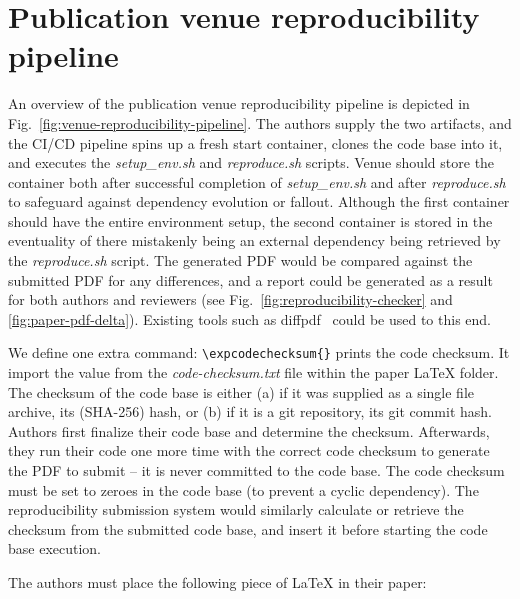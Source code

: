 
\section{Publication venue reproducibility pipeline}
\label{appendix:reproducibility}

An overview of the publication venue reproducibility pipeline is depicted in Fig.~\ref{fig:venue-reproducibility-pipeline}. The authors supply the two artifacts, and the CI/CD pipeline spins up a fresh start container, clones the code base into it, and executes the \textit{setup\_env.sh} and \textit{reproduce.sh} scripts. Venue should store the container both after successful completion of \textit{setup\_env.sh} and after \textit{reproduce.sh} to safeguard against \eg dependency evolution or fallout. Although the first container should have the entire environment setup, the second container is stored in the eventuality of there mistakenly being an external dependency being retrieved by the \textit{reproduce.sh} script. The generated PDF would be compared against the submitted PDF for any differences, and a report could be generated as a result for both authors and reviewers (see Fig.~\ref{fig:reproducibility-checker} and \ref{fig:paper-pdf-delta}). Existing tools such as diffpdf~\cite{diffpdf} could be used to this end.

 We define one extra command: \texttt{\textbackslash expcodechecksum\{\}} prints the code checksum. It import the value from the \textit{code-checksum.txt} file within the paper \LaTeX{} folder. The checksum of the code base is either (a) if it was supplied as a single file archive, its (SHA-256) hash, or (b) if it is a git repository, its git commit hash. Authors first finalize their code base and determine the checksum. Afterwards, they run their code one more time with the correct code checksum to generate the PDF to submit -- it is never committed to the code base. The code checksum must be set to zeroes in the code base (to prevent a cyclic dependency). The reproducibility submission system would similarly calculate or retrieve the checksum from the submitted code base, and insert it before starting the code base execution.

The authors must place the following piece of \LaTeX{} in their paper:

